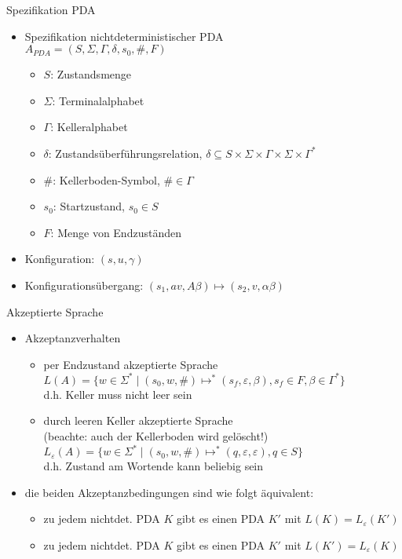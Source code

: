 \begin{frame}{Spezifikation PDA}
	\begin{itemize}
		\item Spezifikation nichtdeterministischer PDA\\
		$A_{PDA}=(S, \Sigma, \Gamma, \delta, s_0, \#, F)$
		\begin{itemize}
			\item $S$: Zustandsmenge
			\item $\Sigma$: Terminalalphabet
			\item $\Gamma$: Kelleralphabet
			\item $\delta$: Zustandsüberführungsrelation, $\delta \subseteq S \times \Sigma \times \Gamma \times \Sigma \times \Gamma^*$
			\item $\#$: Kellerboden-Symbol, $\# \in \Gamma$
			\item $s_0$: Startzustand, $s_0 \in S$
			\item $F$: Menge von Endzuständen
		\end{itemize}
		\item Konfiguration: $(s, u, \gamma)$
		\item Konfigurationsübergang: $(s_1, av, A\beta) \mapsto (s_2, v, \alpha\beta)$
	\end{itemize}
	\centering
\end{frame}

\begin{frame}{Akzeptierte Sprache}
	\begin{itemize}
		\item Akzeptanzverhalten
		\begin{itemize}
			\item per Endzustand akzeptierte Sprache\\
			$L(A)=\{w \in \Sigma^* \mid (s_0, w, \#) \mapsto^* (s_f, \varepsilon, \beta), s_f \in F, \beta \in \Gamma^*\}$\\
			d.h. Keller muss nicht leer sein
			\item durch leeren Keller akzeptierte Sprache\\
			(beachte: auch der Kellerboden wird gelöscht!)\\
			$L_\varepsilon(A)=\{w \in \Sigma^*\mid (s_0, w, \#) \mapsto^* (q, \varepsilon, \varepsilon), q \in S\}$\\
			d.h. Zustand am Wortende kann beliebig sein
		\end{itemize}
		\item die beiden Akzeptanzbedingungen sind wie folgt äquivalent:
		\begin{itemize}
			\item zu jedem nichtdet. PDA $K$ gibt es einen PDA $K'$ mit $L(K) = L_\varepsilon(K')$
			\item zu jedem nichtdet. PDA $K$ gibt es einen PDA $K'$ mit $L(K') = L_\varepsilon(K)$
		\end{itemize}
	\end{itemize}
\end{frame}

